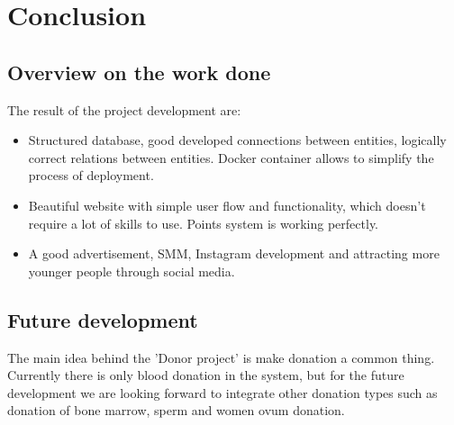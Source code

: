\chapter{Conclusion}\label{ch:concl}
\par
\section{Overview on the work done}
The result of the project development are:
\begin{itemize}
  \item Structured database, good developed connections between entities, logically correct relations between entities. Docker container allows to simplify the process of deployment.
  \item Beautiful website with simple user flow and functionality, which doesn't require a lot of skills to use. Points system is working perfectly.
  \item A good advertisement, SMM, Instagram development and attracting more younger people through social media.
\end{itemize}
\par
\section{Future development}
The main idea behind the 'Donor project' is make donation a common thing. Currently there is only blood donation in the system, but for the future development we are looking forward to integrate other donation types such as donation of bone marrow, sperm and women ovum donation. 
